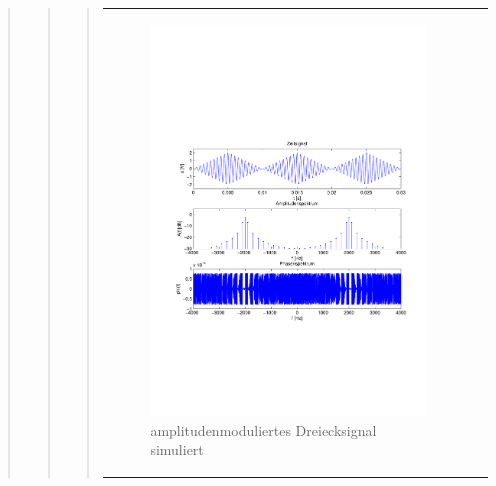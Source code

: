 \begin{quote}
\begin{quote}
\begin{quote}
                        \begin{center}
                \begin{tabular}{ll}
    
                \hspace{-10em}
                    \begin{minipage}{0.6\textwidth}
    
                        \begin{figure}[H]
                            \label{fig:}
                            \includegraphics[scale=0.4, trim = 2cm 6.5cm 1.5cm
                            8.5cm, clip]{./Bilder/Dreieckmodsimuliert} %
                            \caption{amplitudenmoduliertes Dreiecksignal simuliert}
                        \end{figure}
    

\end{minipage}
\end{tabular}
\end{center}
\end{quote}
\end{quote}
\end{quote}
